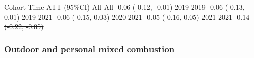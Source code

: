 \documentclass[
  letterpaper,
  DIV=11,
  numbers=noendperiod]{scrartcl}
\providecommand{\DIFadd}[1]{{\protect\color{blue}\underline{#1}}} %
\providecommand{\DIFdel}[1]{{\protect\color{red}\sout{#1}}}                      %
\providecommand{\DIFaddbegin}{} %
\providecommand{\DIFaddend}{} %
\providecommand{\DIFdelbegin}{} %
\providecommand{\DIFdelend}{} %
\providecommand{\DIFdelFL}[1]{\DIFdel{#1}} %
\newcommand{\DIFscaledelfig}{0.5}
\newlength{\DIFdelgraphicswidth} %
\newlength{\DIFdelgraphicsheight} %
\newcommand{\DIFaddincludegraphics}[2][]{{\color{blue}\fbox{\DIFOincludegraphics[#1]{#2}}}} %
\newcommand{\DIFdelincludegraphics}[2][]{%
\sbox{\DIFdelgraphicsbox}{\DIFOincludegraphics[#1]{#2}}%
\settoboxwidth{\DIFdelgraphicswidth}{\DIFdelgraphicsbox} %
\settoboxtotalheight{\DIFdelgraphicsheight}{\DIFdelgraphicsbox} %
\scalebox{\DIFscaledelfig}{%
\parbox[b]{\DIFdelgraphicswidth}{\usebox{\DIFdelgraphicsbox}\\[-\baselineskip] \rule{\DIFdelgraphicswidth}{0em}}\llap{\resizebox{\DIFdelgraphicswidth}{\DIFdelgraphicsheight}{%
\setlength{\unitlength}{\DIFdelgraphicswidth}%
\begin{picture}(1,1)%
\thicklines\linethickness{2pt} %
{\color[rgb]{1,0,0}\put(0,0){\framebox(1,1){}}}%
{\color[rgb]{1,0,0}\put(0,0){\line( 1,1){1}}}%
{\color[rgb]{1,0,0}\put(0,1){\line(1,-1){1}}}%
\end{picture}%
}\hspace*{3pt}}} %
} %
\DeclareRobustCommand{\DIFaddbegin}{\DIFOaddbegin \let\includegraphics\DIFaddincludegraphics} %
\DeclareRobustCommand{\DIFaddend}{\DIFOaddend \let\includegraphics\DIFOincludegraphics} %
\DeclareRobustCommand{\DIFdelbegin}{\DIFOdelbegin \let\includegraphics\DIFdelincludegraphics} %
\DeclareRobustCommand{\DIFdelend}{\DIFOaddend \let\includegraphics\DIFOincludegraphics} %
\begin{document}
\DIFdelFL{Cohort }%
\DIFdelFL{Time }%
\DIFdelFL{ATT }%
\DIFdelFL{(95\%CI)}%
\DIFdelFL{All }%
\DIFdelFL{All }%
\DIFdelFL{-0.06 }%
\DIFdelFL{(-0.12, -0.01)}%
\DIFdelFL{2019 }%
\DIFdelFL{2019 }%
\DIFdelFL{-0.06 }%
\DIFdelFL{(-0.13, 0.01)}%
\DIFdelFL{2019 }%
\DIFdelFL{2021 }%
\DIFdelFL{-0.06 }%
\DIFdelFL{(-0.15, 0.03)}%
\DIFdelFL{2020 }%
\DIFdelFL{2021 }%
\DIFdelFL{-0.05 }%
\DIFdelFL{(-0.16, 0.05)}%
\DIFdelFL{2021 }%
\DIFdelFL{2021 }%
\DIFdelFL{-0.14 }%
\DIFdelFL{(-0.22, -0.05)}%

\DIFdelend \newpage

\DIFdelbegin %
\DIFdelend \DIFaddbegin \subsubsection{\DIFadd{Outdoor and personal mixed
combustion}}\label{outdoor-and-personal-mixed-combustion}
\DIFaddend 
\end{document}
